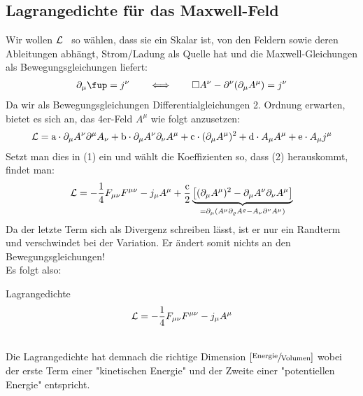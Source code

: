 \subsection{Lagrangedichte für das Maxwell-Feld}
Wir wollen $\mathcal{L}$ \ so wählen, dass sie ein Skalar ist, von den Feldern sowie deren Ableitungen abhängt, Strom/Ladung als Quelle hat und die Maxwell-Gleichungen als Bewegungsgleichungen liefert:
\begin{align}
\partial_{\mu}\fup = j^{\nu} \qquad  \Longleftrightarrow \qquad \Box A^{\nu} - \partial^{\nu}(\partial_{\mu}A^{\mu}) = j^{\nu}
\end{align}
Da wir als Bewegungsgleichungen Differentialgleichungen 2. Ordnung erwarten, bietet es sich an, das 4er-Feld $A^{\mu}$ wie folgt anzusetzen:
\begin{align*}
\mathcal{L} = \text{a} \cdot \partial_{\mu}A^{\nu}\partial^{\mu}A_{\nu} + \text{b} \cdot \partial_{\mu}A^{\nu}\partial_{\nu}A^{\mu} + \text{c} \cdot (\partial_{\mu}A^{\mu})^2 + \text{d} \cdot A_{\mu}A^{\mu} + \text{e} \cdot A_{\mu}j^{\mu}
\end{align*}
Setzt man dies in (1) ein und wählt die Koeffizienten so, dass (2) herauskommt, findet man:
\begin{align*}
\mathcal{L} = -\frac{1}{4} F_{\mu \nu} F^{\mu \nu} - j_{\mu}A^{\mu} + \frac{\text{c}}{2} \underbrace{\left[ (\partial_{\mu}A^{\mu})^2 - \partial_{\mu}A^{\nu}\partial_{\nu}A^{\mu} \right]}_{= \partial_{\mu}(A^{\mu}\partial_{\varrho}A^{\varrho}-A_{\nu}\partial^{\nu}A^{\mu})}
\end{align*}
Da der letzte Term sich als Divergenz schreiben lässt, ist er nur ein Randterm und verschwindet bei der Variation. Er ändert somit nichts an den Bewegungsgleichungen! \\ 
Es folgt also:
\begin{mybox}{Lagrangedichte}
\begin{align}
\mathcal{L} = -\frac{1}{4} F_{\mu \nu} F^{\mu \nu} - j_{\mu}A^{\mu}
\end{align}
\end{mybox}
\phantom{.} \\
Die Lagrangedichte hat demnach die richtige Dimension $\left[\sfrac{\text{Energie}}{\text{Volumen}}\right]$ wobei der erste Term einer "kinetischen Energie" und der Zweite einer "potentiellen Energie" entspricht. \\

